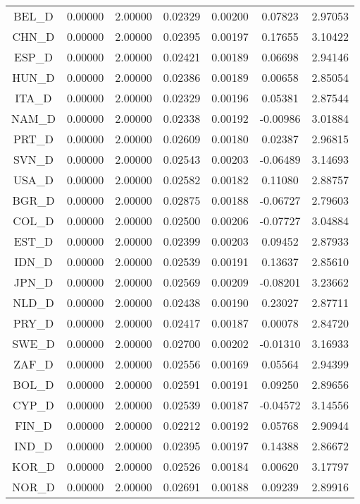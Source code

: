 \begin{longtable}{c c c c c c c}
BEL_D & 0.00000 & 2.00000 & 0.02329 & 0.00200 & 0.07823 & 2.97053 \\
CHN_D & 0.00000 & 2.00000 & 0.02395 & 0.00197 & 0.17655 & 3.10422 \\
ESP_D & 0.00000 & 2.00000 & 0.02421 & 0.00189 & 0.06698 & 2.94146 \\
HUN_D & 0.00000 & 2.00000 & 0.02386 & 0.00189 & 0.00658 & 2.85054 \\
ITA_D & 0.00000 & 2.00000 & 0.02329 & 0.00196 & 0.05381 & 2.87544 \\
NAM_D & 0.00000 & 2.00000 & 0.02338 & 0.00192 & -0.00986 & 3.01884 \\
PRT_D & 0.00000 & 2.00000 & 0.02609 & 0.00180 & 0.02387 & 2.96815 \\
SVN_D & 0.00000 & 2.00000 & 0.02543 & 0.00203 & -0.06489 & 3.14693 \\
USA_D & 0.00000 & 2.00000 & 0.02582 & 0.00182 & 0.11080 & 2.88757 \\
BGR_D & 0.00000 & 2.00000 & 0.02875 & 0.00188 & -0.06727 & 2.79603 \\
COL_D & 0.00000 & 2.00000 & 0.02500 & 0.00206 & -0.07727 & 3.04884 \\
EST_D & 0.00000 & 2.00000 & 0.02399 & 0.00203 & 0.09452 & 2.87933 \\
IDN_D & 0.00000 & 2.00000 & 0.02539 & 0.00191 & 0.13637 & 2.85610 \\
JPN_D & 0.00000 & 2.00000 & 0.02569 & 0.00209 & -0.08201 & 3.23662 \\
NLD_D & 0.00000 & 2.00000 & 0.02438 & 0.00190 & 0.23027 & 2.87711 \\
PRY_D & 0.00000 & 2.00000 & 0.02417 & 0.00187 & 0.00078 & 2.84720 \\
SWE_D & 0.00000 & 2.00000 & 0.02700 & 0.00202 & -0.01310 & 3.16933 \\
ZAF_D & 0.00000 & 2.00000 & 0.02556 & 0.00169 & 0.05564 & 2.94399 \\
BOL_D & 0.00000 & 2.00000 & 0.02591 & 0.00191 & 0.09250 & 2.89656 \\
CYP_D & 0.00000 & 2.00000 & 0.02539 & 0.00187 & -0.04572 & 3.14556 \\
FIN_D & 0.00000 & 2.00000 & 0.02212 & 0.00192 & 0.05768 & 2.90944 \\
IND_D & 0.00000 & 2.00000 & 0.02395 & 0.00197 & 0.14388 & 2.86672 \\
KOR_D & 0.00000 & 2.00000 & 0.02526 & 0.00184 & 0.00620 & 3.17797 \\
NOR_D & 0.00000 & 2.00000 & 0.02691 & 0.00188 & 0.09239 & 2.89916 \\

\end{longtable}
